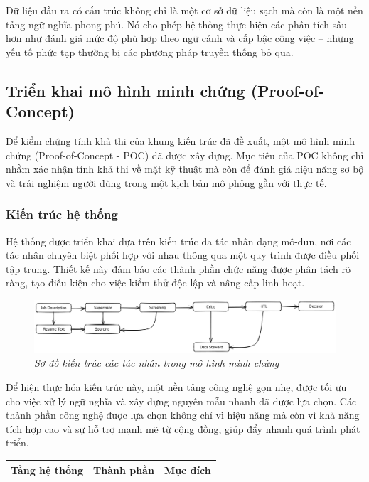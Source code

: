 \documentclass{article}
\begin{document}
\begin{itemize}[topsep=0pt, itemsep=4pt, leftmargin=40pt]
Dữ liệu đầu ra có cấu trúc không chỉ là một cơ sở dữ liệu sạch mà còn là một nền tảng ngữ nghĩa phong phú. Nó cho phép hệ thống thực hiện các phân tích sâu hơn như đánh giá mức độ phù hợp theo ngữ cảnh và cấp bậc công việc – những yếu tố phức tạp thường bị các phương pháp truyền thống bỏ qua.

\subsection{Triển khai mô hình minh chứng (Proof-of-Concept)}
Để kiểm chứng tính khả thi của khung kiến trúc đã đề xuất, một mô hình minh chứng (Proof-of-Concept - POC) đã được xây dựng. Mục tiêu của POC không chỉ nhằm xác nhận tính khả thi về mặt kỹ thuật mà còn để đánh giá hiệu năng sơ bộ và trải nghiệm người dùng trong một kịch bản mô phỏng gần với thực tế.

\subsubsection{Kiến trúc hệ thống}
Hệ thống được triển khai dựa trên kiến trúc đa tác nhân dạng mô-đun, nơi các tác nhân chuyên biệt phối hợp với nhau thông qua một quy trình được điều phối tập trung. Thiết kế này đảm bảo các thành phần chức năng được phân tách rõ ràng, tạo điều kiện cho việc kiểm thử độc lập và nâng cấp linh hoạt.

\begin{figure}[H]
    \centering
    \includegraphics[width=1\linewidth]{img/agents-in-poc.png}
    \caption{\textit{Sơ đồ kiến trúc các tác nhân trong mô hình minh chứng}}
    \label{fig:agents-in-poc}
\end{figure}

Để hiện thực hóa kiến trúc này, một nền tảng công nghệ gọn nhẹ, được tối ưu cho việc xử lý ngữ nghĩa và xây dựng nguyên mẫu nhanh đã được lựa chọn. Các thành phần công nghệ được lựa chọn không chỉ vì hiệu năng mà còn vì khả năng tích hợp cao và sự hỗ trợ mạnh mẽ từ cộng đồng, giúp đẩy nhanh quá trình phát triển.

\begin{longtable}{|
  >{\raggedright\arraybackslash}p{}|
  >{\raggedright\arraybackslash}p{}|
  >{\raggedright\arraybackslash}p{}|}
  \hline
  \textbf{Tầng hệ thống} &
  \textbf{Thành phần} &
  \textbf{Mục đích} \\
  \hline
  \endfirsthead


\end{longtable}
\end{itemize}
\end{document}
